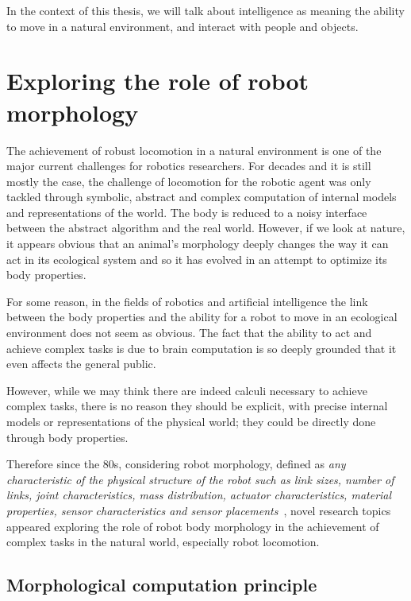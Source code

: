 In the context of this thesis, we will talk about intelligence as meaning the ability to move in a natural environment, and interact with people and objects.



\section{Exploring the role of robot morphology} %

The achievement of robust locomotion in a natural environment is one of the major current challenges for robotics researchers. For decades and it is still mostly the case, the challenge of locomotion for the robotic agent was only tackled through symbolic, abstract and complex computation of internal models and representations of the world. The body is reduced to a noisy interface between the abstract algorithm and the real world.
However, if we look at nature, it appears obvious that an animal’s morphology deeply changes the way it can act in its ecological system and so it has evolved in an attempt to optimize its body properties.

For some reason, in the fields of robotics and artificial intelligence the link between the body properties and the ability for a robot to move in an ecological environment does not seem as obvious. The fact that the ability to act and achieve complex tasks is due to brain computation is so deeply grounded that it even affects the general public.

However, while we may think there are indeed calculi necessary to achieve complex tasks, there is no reason they should be explicit, with precise internal models or representations of the physical world; they could be directly done through body properties.

Therefore since the 80s, considering robot morphology, defined as \emph{any characteristic of the physical structure of the robot such as link sizes, number of links, joint characteristics, mass distribution, actuator characteristics, material properties, sensor characteristics and sensor placements}~\parencite{paul2006morphological}, novel research topics appeared exploring the role of robot body morphology in the achievement of complex tasks in the natural world, especially robot locomotion.


\subsection{Morphological computation principle} %

